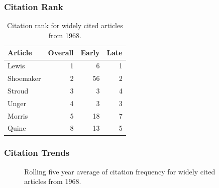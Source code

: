 \documentclass[
  10pt,
  letterpaper,
  DIV=11,
  numbers=noendperiod,
  twoside]{scrartcl}
\begin{document}
\subsubsection*{Citation Rank}\label{sec-rank-1968}

\begin{longtable}[]{@{}lrrr@{}}

\caption{\label{tbl-citation-rank-1968}Citation rank for widely cited
articles from 1968.}

\tabularnewline

\toprule\noalign{}
Article & Overall & Early & Late \\
\midrule\noalign{}
\endhead
\bottomrule\noalign{}
\endlastfoot
Lewis & 1 & 6 & 1 \\
Shoemaker & 2 & 56 & 2 \\
Stroud & 3 & 3 & 4 \\
Unger & 4 & 3 & 3 \\
Morris & 5 & 18 & 7 \\
Quine & 8 & 13 & 5 \\

\end{longtable}

\subsubsection*{Citation Trends}\label{sec-trends-1968}

\begin{figure}


\caption{\label{fig-citation-spaghetti-1968}Rolling five year average of
citation frequency for widely cited articles from 1968.}

\end{figure}%
\end{document}
